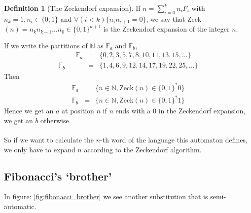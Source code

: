 \documentclass{article}
\theoremstyle{definition}
\newtheorem{definition}[theorem]{Definition}
\begin{document}
\begin{definition}[The Zeckendorf expansion]
If $n = \sum_{i = 0}^k n_i F_i$ with $n_k = 1, n_i \in \{0, 1\}$ and
$\forall (i < k) \{n_i n_{i + 1} = 0\}$, we say that
Zeck$(n) = n_k n_{k - 1} \ldots n_0 \in \{0, 1\}^{k + 1}$ is the Zeckendorf
expansion of the integer $n$.
\end{definition}

If we write the partitions of
$\mathbb{N}$ as $\mathbb{F}_a$ and $\mathbb{F}_b$,
\begin{eqnarray*}
\;\;\;\;\;\;\;\;\;
  \mathbb{F}_a &=& \{0, 2, 3, 5, 7, 8, 10, 11, 13, 15, \ldots\}\\
  \mathbb{F}_b &=& \{1, 4, 6, 9, 12, 14, 17, 19, 22, 25, \ldots\}
\end{eqnarray*}
Then
\begin{eqnarray*}
  \mathbb{F}_a &=& \{n \in \mathbb{N}, \mathrm{Zeck}(n) \in \{0, 1\}^* 0\}\\
  \mathbb{F}_b &=& \{n \in \mathbb{N}, \mathrm{Zeck}(n) \in \{0, 1\}^* 1\}
\end{eqnarray*}
Hence we get an $a$ at position $n$ if $n$ ends with a 0 in the
Zeckendorf expansion, we get an $b$ otherwise.\\
\\
So if we want to calculate the $n$-th word of the language this automaton 
defines, we only have to expand $n$ according to the Zeckendorf algorithm.

\subsection{Fibonacci's `brother'}
In figure: \ref{fig:fibonacci_brother} we see another substitution that is 
semi-automatic.
\end{document}
